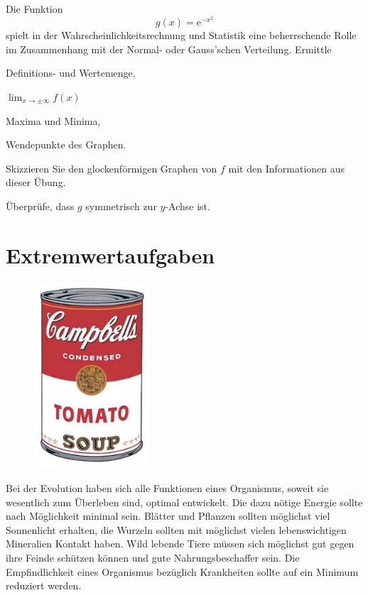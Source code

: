\documentclass[%
11pt,%
twoside,%
titlepage,%
german,%
headsepline%
]{scrartcl}
\begin{document}
\begin{ueb}[Glockenkurve]
Die
Funktion
$$g(x)=\mathrm{e}^{-x^2}$$
spielt in der Wahrscheinlichkeitsrechnung und Statistik eine beherrschende Rolle im Zusammenhang mit der Normal- oder Gauss'schen Verteilung. Ermittle
\begin{enumeratea}
\item Definitions- und Wertemenge,
\item $\lim_{x\to\pm\infty}f(x)$
\item Maxima und Minima,
\item Wendepunkte des Graphen.
\item Skizzieren Sie den glockenf\"ormigen Graphen von $f$ mit den Informationen aus dieser \"Ubung.
\item \"Uberpr\"ufe, dass $g$ symmetrisch zur $y$-Achse ist.
\end{enumeratea}
\end{ueb}

\clearpage

\section{Extremwertaufgaben}
\begin{figure}
\vspace{-22pt}
  \begin{center}
    \includegraphics[width=0.382\textwidth]{pictures/can}
  \end{center}
\vspace{-10pt}
\end{figure}
Bei der Evolution haben sich alle Funktionen eines Organismus, soweit sie wesentlich zum \"Uberleben sind, optimal entwickelt. Die dazu n\"otige Energie sollte nach M\"oglichkeit minimal sein. Bl\"atter und Pflanzen sollten m\"oglichst viel Sonnenlicht erhalten, die Wurzeln sollten mit m\"oglichst vielen lebenswichtigen Mineralien Kontakt haben. Wild lebende Tiere m\"ussen sich m\"oglichst gut gegen ihre Feinde sch\"utzen k\"onnen und gute Nahrungsbeschaffer sein. Die Empfindlichkeit eines Organismus bez\"uglich Krankheiten sollte auf ein Minimum reduziert werden.
\end{document}
